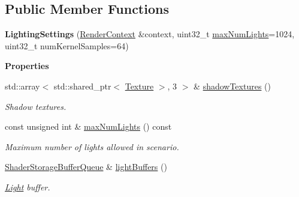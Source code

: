 \subsection*{Public Member Functions}
\begin{DoxyCompactItemize}
\item 
\mbox{\label{classrev_1_1_lighting_settings_a609d80df02d371192e7eb0a062996799}} 
{\bfseries Lighting\+Settings} (\mbox{\hyperlink{classrev_1_1_render_context}{Render\+Context}} \&context, uint32\+\_\+t \mbox{\hyperlink{classrev_1_1_lighting_settings_a82d6920a58c781e45bf89ec9254e83f1}{max\+Num\+Lights}}=1024, uint32\+\_\+t num\+Kernel\+Samples=64)
\end{DoxyCompactItemize}
\begin{Indent}\textbf{ Properties}\par
\begin{DoxyCompactItemize}
\item 
\mbox{\label{classrev_1_1_lighting_settings_aa826ce51ff32b1172afeb4a1bd7bf5c9}} 
std\+::array$<$ std\+::shared\+\_\+ptr$<$ \mbox{\hyperlink{classrev_1_1_texture}{Texture}} $>$, 3 $>$ \& \mbox{\hyperlink{classrev_1_1_lighting_settings_aa826ce51ff32b1172afeb4a1bd7bf5c9}{shadow\+Textures}} ()
\begin{DoxyCompactList}\small\item\em Shadow textures. \end{DoxyCompactList}\item 
\mbox{\label{classrev_1_1_lighting_settings_a82d6920a58c781e45bf89ec9254e83f1}} 
const unsigned int \& \mbox{\hyperlink{classrev_1_1_lighting_settings_a82d6920a58c781e45bf89ec9254e83f1}{max\+Num\+Lights}} () const
\begin{DoxyCompactList}\small\item\em Maximum number of lights allowed in scenario. \end{DoxyCompactList}\item 
\mbox{\label{classrev_1_1_lighting_settings_a282ebbac846e1ac629805f19998dc136}} 
\mbox{\hyperlink{classrev_1_1_buffer_queue}{Shader\+Storage\+Buffer\+Queue}} \& \mbox{\hyperlink{classrev_1_1_lighting_settings_a282ebbac846e1ac629805f19998dc136}{light\+Buffers}} ()
\begin{DoxyCompactList}\small\item\em \mbox{\hyperlink{classrev_1_1_light}{Light}} buffer. \end{DoxyCompactList}\item 

\end{DoxyCompactItemize}
\end{Indent}
